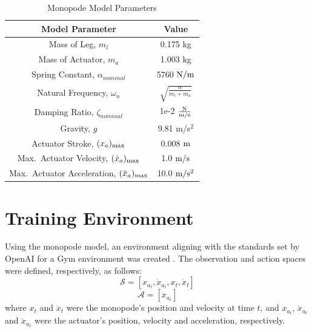 \begin{table}[tb!]
  \caption{Monopode Model Parameters}
    \begin{center}
    \vspace{-12pt}
      \begin{tabular}{c c}
        \textbf{Model Parameter}                                 & \textbf{Value}                                    \\
        \hline
        \hline
        Mass of Leg, $m_l$                                       & 0.175 kg                                          \\
        Mass of Actuator, $m_a$                                  & 1.003 kg                                          \\
        Spring Constant, $\alpha_{nominal}$                      & 5760 $\textup{N}/\textup{m}$                      \\
        Natural Frequency, $\omega_n$                            & $\sqrt{\frac{\alpha}{m_l + m_a}}$                 \\
        Damping Ratio, $\zeta_{nominal}$                         & 1e-2 $\frac{\textup{N}}{\textup{m/s}}$            \\
        Gravity, $g$                                             & 9.81 m/s$^2$                                      \\
        \hline
        Actuator Stroke, $(x_{a})_{\textup{max}}$                & 0.008 $\textup{m}$                                \\
        Max.\ Actuator Velocity, $(\dot{x}_{a})_{\textup{max}}$  & 1.0 $\textup{m}/\textup{s}$                       \\ 
        Max.\ Actuator Acceleration, $(\ddot{x}_{a})_{\textup{max}}$   & 10.0 $\textup{m}/\textup{s}^2$              \\
        \hline
        \hline
      \end{tabular}
      \label{tab:monopode_params}
    \end{center}
\end{table}
%  

\section{Training Environment}
Using the monopode model, an environment aligning with the standards set by OpenAI for a Gym environment was created \cite{Brockman2016c}. The observation and action spaces were defined, respectively, as follows:
% 
\begin{equation}
  \mathcal{S} = \left[ x_{a_t}, \dot{x}_{a_t}, x_t, \dot{x}_t \right]
\end{equation}
% 
\begin{equation}
  \mathcal{A} = [\ddot{x}_{a_t}]
\end{equation}
% 
where $x_t$ and $\dot{x}_t$ were the monopode's position and velocity at time $t$, and $x_{a_t}$, $\dot{x}_{a_t}$ and $\ddot{x}_{a_t}$ were the actuator's position, velocity and acceleration, respectively.

